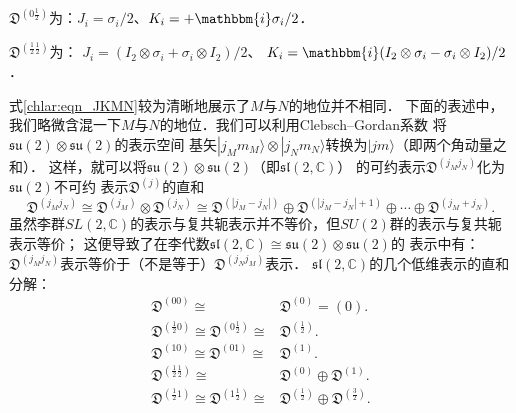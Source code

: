 $\mathfrak{D}^{(0\frac{1}{2})}$为：$J_i = \sigma_i/2$、$K_i =+\mathbbm{i} \sigma_i/2$．

$\mathfrak{D}^{(\frac{1}{2}\frac{1}{2})}$为：
$J_i = (I_2\otimes\sigma_i + \sigma_i\otimes I_2)/2$、
$K_i =\mathbbm{i} (I_2\otimes\sigma_i - \sigma_i\otimes I_2)/2$．

式\eqref{chlar:eqn_JKMN}较为清晰地展示了$M$与$N$的地位并不相同．
下面的表述中，我们略微含混一下$M$与$N$的地位．我们可以利用Clebsch--Gordan系数
将$\mathfrak{su}(2)\otimes\mathfrak{su}(2)$的表示空间
基矢$|j_M m_M\rangle \otimes|j_N m_N\rangle$转换为$|jm \rangle$（即两个角动量之和）．
这样，就可以将$\mathfrak{su}(2)\otimes\mathfrak{su}(2)$（即$\mathfrak{sl}(2,\mathbb{C})$）
的可约表示$\mathfrak{D}^{(j_M j_N)}$化为$\mathfrak{su}(2)$不可约
表示$\mathfrak{D}^{(j)}$的直和\cite[\S 11.6]{taorb-2011-gt}
\begin{equation}\label{chlar:eqn_DLDU}
    \mathfrak{D}^{(j_M j_N)} \cong \mathfrak{D}^{(j_M)}\otimes\mathfrak{D}^{(j_N)} \cong
    \mathfrak{D}^{(|j_M- j_N|)}\oplus \mathfrak{D}^{(|j_M- j_N|+1)}
    \oplus \cdots \oplus \mathfrak{D}^{(j_M+ j_N)}.
\end{equation}
虽然李群$SL(2,\mathbb{C})$的表示与复共轭表示并不等价，但$SU(2)$群的表示与复共轭表示等价；
这便导致了在{\kaishu 李代数}$\mathfrak{sl}(2,\mathbb{C})\cong \mathfrak{su}(2)\otimes\mathfrak{su}(2)$的
表示中有：$\mathfrak{D}^{(j_M j_N)}$表示{\fangsong 等价于}（不是{\kaishu 等于}）$ \mathfrak{D}^{(j_N j_M)}$表示．
$\mathfrak{sl}(2,\mathbb{C})$的几个低维表示的直和分解：
\begin{align}
    \mathfrak{D}^{(00)} {\cong} &\mathfrak{D}^{(0)}= (0) . \label{chlar:eqn_D-scalar} \\
    \mathfrak{D}^{(\frac{1}{2}0)} \cong \mathfrak{D}^{(0\frac{1}{2})} {\cong}& \mathfrak{D}^{(\frac{1}{2})} . 
    \label{chlar:eqn_D-Weyl-Spinor} \\
    \mathfrak{D}^{(10)} \cong \mathfrak{D}^{(01)} {\cong}& \mathfrak{D}^{(1)} . \label{chlar:eqn_D0110}\\
    \mathfrak{D}^{(\frac{1}{2}\frac{1}{2})} {\cong} & \mathfrak{D}^{(0)}\oplus \mathfrak{D}^{(1)} . 
    \label{chlar:eqn_D-Vector} \\
    \mathfrak{D}^{(\frac{1}{2}1)} \cong \mathfrak{D}^{(1\frac{1}{2})} {\cong}&
       \mathfrak{D}^{(\frac{1}{2})}\oplus \mathfrak{D}^{(\frac{3}{2})} . 
\end{align}


